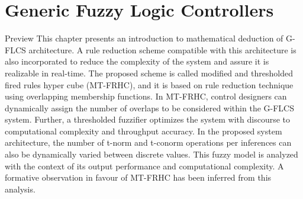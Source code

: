 \chapter{Generic Fuzzy Logic Controllers}
\begin{chapterAbstract}{Preview}
This chapter presents an introduction to mathematical deduction of G\hyp{}FLCS architecture. A rule reduction scheme compatible with this architecture is also incorporated to reduce the complexity of the system and assure it is realizable in real-time. The proposed scheme is called modified and thresholded fired rules hyper cube (MT-FRHC), and it is based on rule reduction technique using overlapping membership functions. In MT-FRHC, control designers can dynamically assign the number of overlaps to be considered within the G\hyp{}FLCS system. Further, a thresholded fuzzifier optimizes the system with discourse to computational complexity and throughput accuracy. In the proposed system architecture, the number of t-norm and t-conorm operations per inferences can also be dynamically varied between discrete values. This fuzzy model is analyzed with the context of its output performance and computational complexity. A formative observation in favour of MT-FRHC has been inferred from this analysis.
\end{chapterAbstract}
\clearpage


